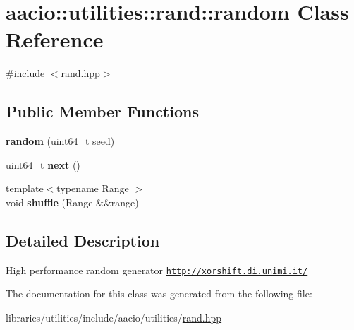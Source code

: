 \hypertarget{classaacio_1_1utilities_1_1rand_1_1random}{}\section{aacio\+:\+:utilities\+:\+:rand\+:\+:random Class Reference}
\label{classaacio_1_1utilities_1_1rand_1_1random}


{\ttfamily \#include $<$rand.\+hpp$>$}

\subsection*{Public Member Functions}
\begin{DoxyCompactItemize}
\item 
\mbox{\label{classaacio_1_1utilities_1_1rand_1_1random_a3e35446f7c6f3836f188ff36d3537f93}} 
{\bfseries random} (uint64\+\_\+t seed)
\item 
\mbox{\label{classaacio_1_1utilities_1_1rand_1_1random_a16d2cf9d9f08197eff3595f503dd157d}} 
uint64\+\_\+t {\bfseries next} ()
\item 
\mbox{\label{classaacio_1_1utilities_1_1rand_1_1random_a393f195f8fcecbac7f74aff8ee0885a5}} 
{\footnotesize template$<$typename Range $>$ }\\void {\bfseries shuffle} (Range \&\&range)
\end{DoxyCompactItemize}


\subsection{Detailed Description}
High performance random generator \href{http://xorshift.di.unimi.it/}{\tt http\+://xorshift.\+di.\+unimi.\+it/} 

The documentation for this class was generated from the following file\+:\begin{DoxyCompactItemize}
\item 
libraries/utilities/include/aacio/utilities/\mbox{\hyperlink{utilities_2include_2aacio_2utilities_2rand_8hpp}{rand.\+hpp}}\end{DoxyCompactItemize}
